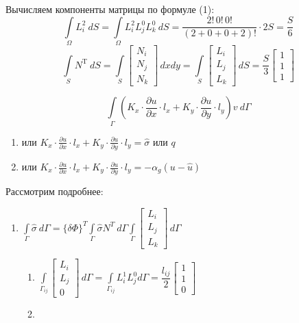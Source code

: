 \documentclass{bmstu}
\begin{document}
	Вычисляем компоненты матрицы по формуле (1):
	\[
	\int\limits_{\Omega} L_i^2 \ dS = \int\limits_{\Omega} L_i^2L_j^0L_k^0 \ dS=  \dfrac{2!\, 0!\, 0!}{(2+0+0+2)!}\cdot 2S=\frac{S}{6}
	\]
	\[
	\int\limits_SN^{\text{T}} \ dS = \int\limits_S \begin{bmatrix}
		N_i \\ N_j \\ N_k
	\end{bmatrix} \, dxdy = \int\limits_S \begin{bmatrix}
	L_i \\ L_j \\ L_k
	\end{bmatrix} \, dS = \frac{S}{3} \begin{bmatrix}
	1 \\ 1 \\ 1
	\end{bmatrix}
	\]
	
	\[
	\int\limits_{\Gamma} \left(K_x \cdot  \frac{\partial u}{\partial x} \cdot l_x + K_y \cdot  \frac{\partial u}{\partial y} \cdot l_y \right)v\ d\Gamma 
	\]
	\begin{enumerate}
		\item или $K_x \cdot  \frac{\partial u}{\partial x} \cdot l_x + K_y \cdot  \frac{\partial u}{\partial y} \cdot l_y=\hat\sigma$ или $q$ 
		\item или $K_x \cdot  \frac{\partial u}{\partial x} \cdot l_x + K_y \cdot  \frac{\partial u}{\partial y} \cdot l_y=-\alpha_g(u-\hat u)$ 
	\end{enumerate}
	
	Рассмотрим подробнее:
	\begin{enumerate}
		\item $
		\int\limits_{\Gamma} \hat \sigma \ d\Gamma = \{\delta \Phi\}^T \int\limits_{\Gamma} \hat \sigma N^T\ d\Gamma\int\limits_{\Gamma} \begin{bmatrix}
			L_i \\ L_j \\ L_k
		\end{bmatrix} \, d\Gamma$
		\begin{enumerate}
			\item $\int\limits_{\Gamma_{ij}} \begin{bmatrix}
				L_i \\ L_j \\ 0
			\end{bmatrix} \, d\Gamma = \int\limits_{\Gamma_{ij}} L_i^1 L_j^0 d\Gamma = \dfrac{l_{ij}}{2}\begin{bmatrix}
			1\\1\\0
		\end{bmatrix}$
		\item 
		\end{enumerate}
	\end{enumerate}
	
\end{document}
